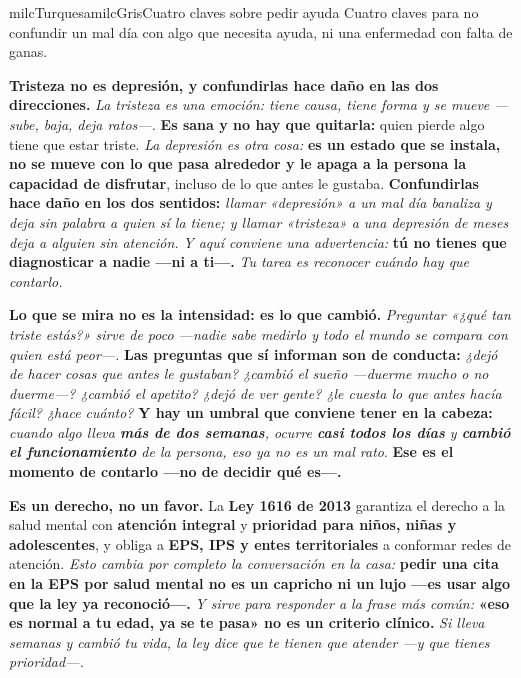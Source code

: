 \documentclass[11pt,letterpaper]{article}
\newcommand{\milcpaso}[3]{%
\Needspace{4\baselineskip}%
\begin{tcolorbox}[enhanced,colback=white,colframe=milcLinea,arc=1.5mm,boxrule=.9pt,
  left=14mm,right=4mm,top=3mm,bottom=3mm,before skip=4pt,after skip=4pt,
  fontupper=\RaggedRight,
  overlay={\node[anchor=north west,circle,fill=#2,text=white,inner sep=0pt,
    minimum size=7.4mm,font=\sffamily\bfseries\small]
    at ([xshift=3.6mm,yshift=-3.2mm]frame.north west) {#1};}]
#3
\end{tcolorbox}}
\begin{document}
\begin{softbox}{milcTurquesa}{milcGris}{Cuatro claves sobre pedir ayuda}
Cuatro claves para no confundir un mal día con algo que necesita ayuda, ni una enfermedad con falta de ganas.
\end{softbox}

\milcpaso{1}{milcTurquesa}{\textbf{Tristeza no es depresión, y confundirlas hace daño en las dos direcciones.} \emph{La tristeza es una emoción: tiene causa, tiene forma y se mueve ---sube, baja, deja ratos---.} \textbf{Es sana y no hay que quitarla:} quien pierde algo tiene que estar triste. \emph{La depresión es otra cosa:} \textbf{es un estado que se instala, no se mueve con lo que pasa alrededor y le apaga a la persona la capacidad de disfrutar}, incluso de lo que antes le gustaba. \textbf{Confundirlas hace daño en los dos sentidos:} \emph{llamar «depresión» a un mal día banaliza y deja sin palabra a quien sí la tiene; y llamar «tristeza» a una depresión de meses deja a alguien sin atención.} \emph{Y aquí conviene una advertencia:} \textbf{tú no tienes que diagnosticar a nadie ---ni a ti---.} \emph{Tu tarea es reconocer cuándo hay que contarlo.}}
\milcpaso{2}{milcTurquesa}{\textbf{Lo que se mira no es la intensidad: es lo que cambió.} \emph{Preguntar «¿qué tan triste estás?» sirve de poco ---nadie sabe medirlo y todo el mundo se compara con quien está peor---.} \textbf{Las preguntas que sí informan son de conducta:} \emph{¿dejó de hacer cosas que antes le gustaban? ¿cambió el sueño ---duerme mucho o no duerme---? ¿cambió el apetito? ¿dejó de ver gente? ¿le cuesta lo que antes hacía fácil? ¿hace cuánto?} \textbf{Y hay un umbral que conviene tener en la cabeza:} \emph{cuando algo lleva \textbf{más de dos semanas}, ocurre \textbf{casi todos los días} y \textbf{cambió el funcionamiento} de la persona, eso ya no es un mal rato}. \textbf{Ese es el momento de contarlo ---no de decidir qué es---.}}
\milcpaso{3}{milcTurquesa}{\textbf{Es un derecho, no un favor.} La \textbf{Ley 1616 de 2013} garantiza el derecho a la salud mental con \textbf{atención integral} y \textbf{prioridad para niños, niñas y adolescentes}, y obliga a \textbf{EPS, IPS y entes territoriales} a conformar redes de atención. \emph{Esto cambia por completo la conversación en la casa:} \textbf{pedir una cita en la EPS por salud mental no es un capricho ni un lujo ---es usar algo que la ley ya reconoció---.} \emph{Y sirve para responder a la frase más común:} \textbf{«eso es normal a tu edad, ya se te pasa» no es un criterio clínico.} \emph{Si lleva semanas y cambió tu vida, la ley dice que te tienen que atender ---y que tienes prioridad---.}}
\end{document}

